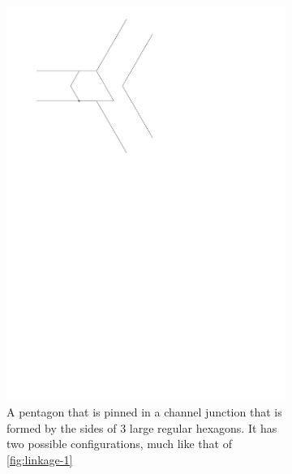 \begin{figure}[h]
\begin{center}
  ~ %
  \begin{subfigure}[b]{0.49\textwidth}
	  \includegraphics[width=\textwidth]{graphics/switchTerminalFinalized2.pdf}
	  \caption{A pentagon that is pinned in a channel junction that is formed by the sides of 3 large regular hexagons. It has two possible configurations, much like that of \ref{fig:linkage-1}}
	  \label{fig:linkage-2-1}
  \end{subfigure}
  \begin{subfigure}[b]{0.49\textwidth}

\end{subfigure}
\end{center}
\end{figure}
